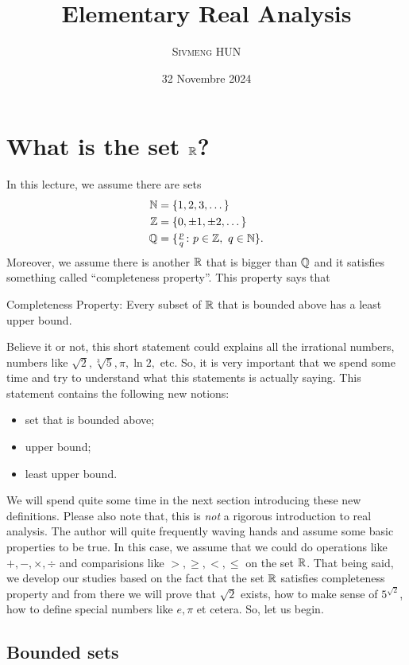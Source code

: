 \documentclass[12pt]{article}
\title{Elementary Real Analysis}
\author{\textsc{Sivmeng HUN}}
\date{32 Novembre 2024}
\begin{document}
\maketitle

\section{What is the set \(\mathbb{R}\)?}
In this lecture, we assume there are sets
\begin{align*}
  \mathbb{N} &= \{ 1, 2, 3, \dots\}\\
  \mathbb{Z} &= \{ 0, \pm 1, \pm 2, \dots\}\\
  \mathbb{Q} &= \{\tfrac{p}{q}\colon p\in\mathbb{Z},~ q\in\mathbb{N}\}.
\end{align*}
Moreover, we assume there is another \(\mathbb{R}\) that is bigger than
\(\mathbb{Q}\) and it satisfies something called ``completeness property''.
This property says that
\medskip
\begin{mdframed}
  \textsf{Completeness Property: }
  Every subset of \(\mathbb{R}\) that is bounded above has a least upper
  bound.
\end{mdframed}
Believe it or not, this short statement could explains all the irrational
numbers, numbers like \(\sqrt{2}, \sqrt[3]{5}, \pi, \ln 2,\) etc.
So, it is very important that we spend some time and try to understand
what this statements is actually saying. This statement contains the following
new notions:
\begin{itemize}
\item set that is bounded above;
\item upper bound;
\item least upper bound.
\end{itemize}

We will spend quite some time in the next section introducing these new
definitions. Please also note that, this is \emph{not} a rigorous 
introduction to real analysis. The author will quite frequently waving hands
and assume some basic properties to be true. In this case, we assume that
we could do operations like \(+, -, \times, \div\) and comparisions like
\(>, \geq, <, \leq\) on the set \(\mathbb{R}\).
That being said,  we develop our studies based on the fact that the set \(\mathbb{R}\)
satisfies completeness property and from there we will prove that
\(\sqrt{2}\) exists, how to make sense of \(5^{\sqrt{2}}\),
how to define special numbers like \(e, \pi\) et cetera.
So, let us begin.


\subsection{Bounded sets}
\end{document}
